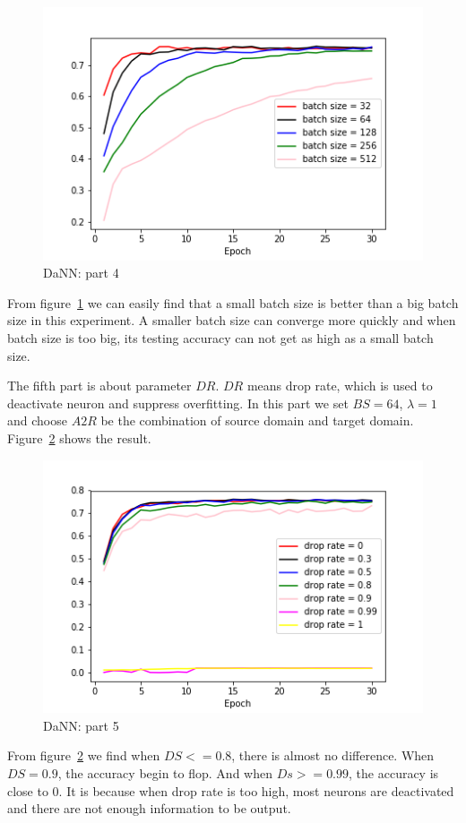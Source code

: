 \documentclass[conference]{IEEEtran}
\begin{document}
\begin{figure}[!h]
    \centerline{\includegraphics[scale=0.4]{HDaNN/DaNN_fig4.png}}
    \caption{DaNN: part 4}
    \label{fig:DaNN4}
\end{figure}

From figure~\ref{fig:DaNN4} we can easily find that a small batch size is better than a big batch size in this experiment. A smaller batch size can converge more quickly and when batch size is too big, its testing accuracy can not get as high as a small batch size.

The fifth part is about parameter $DR$. $DR$ means drop rate, which is used to deactivate neuron and suppress overfitting.  In this part we set $BS = 64$, $\lambda = 1$ and choose $A2R$ be the combination of source domain and target domain. Figure~\ref{fig:DaNN5} shows the result.
\begin{figure}[!h]
    \centerline{\includegraphics[scale=0.4]{HDaNN/DaNN_fig5.png}}
    \caption{DaNN: part 5}
    \label{fig:DaNN5}
\end{figure}

From figure~\ref{fig:DaNN5} we find when $DS <= 0.8$, there is almost no difference. When $DS = 0.9$, the accuracy begin to flop. And when $Ds>=0.99$, the accuracy is close to 0. It is because when drop rate is too high, most neurons are deactivated and there are not enough information to be output.
\end{document}
